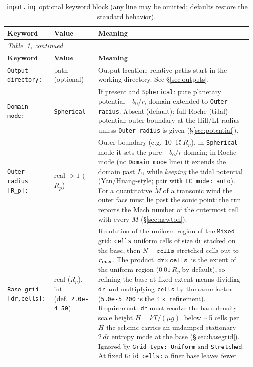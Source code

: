 \documentclass[english,a4paper]{my_memo}
\newcommand{\rp}{\ensuremath{R_p}}   %
\begin{document}
\begin{longtable}{@{}p{}p{}p{}@{}}
\caption{\texttt{input.inp} optional keyword block (any line may be omitted;
defaults restore the standard behavior).}\label{tab:inp-opt}\\
\toprule
\textbf{Keyword} & \textbf{Value} & \textbf{Meaning} \\
\midrule
\endfirsthead
\multicolumn{3}{l}{\small\itshape Table~\ref{tab:inp-opt}, continued}\\
\toprule \textbf{Keyword} & \textbf{Value} & \textbf{Meaning} \\ \midrule
\endhead
\bottomrule
\endfoot
\texttt{Output directory:} & path (optional) & Output location; relative paths
  start in the working directory. See \S\ref{sec:outputs}. \\
\texttt{Domain mode:} & \texttt{Spherical} & If present and \texttt{Spherical}:
  pure planetary potential $-b_0/r$, domain extended to \texttt{Outer radius}.
  Absent (default): full Roche (tidal) potential; outer boundary at the Hill/L1
  radius unless \texttt{Outer radius} is given (\S\ref{sec:potential}). \\
\texttt{Outer radius [R\_p]:} & real $>1$ (\rp) & Outer boundary (e.g.\
  10--15\,\rp). In \texttt{Spherical} mode it sets the pure-$-b_0/r$ domain; in
  Roche mode (no \texttt{Domain mode} line) it extends the domain past $L_1$ while
  \emph{keeping} the tidal potential (Yan/Huang-style; pair with
  \texttt{IC mode: auto}). For a quantitative $\dot M$ of a transonic wind the
  outer face must lie past the sonic point: the run reports the Mach number of
  the outermost cell with every $\dot M$ (\S\ref{sec:newton}). \\
\texttt{Base grid [dr,cells]:} & real (\rp), int
  (def.\ \texttt{2.0e-4 50}) & Resolution of the uniform region of the
  \texttt{Mixed} grid: \texttt{cells} uniform cells of size \texttt{dr} stacked
  on the base, then $N-\texttt{cells}$ stretched cells out to $r_{\rm max}$.
  The product $\texttt{dr}\times\texttt{cells}$ is the extent of the uniform
  region ($0.01\,R_p$ by default), so refining the base at fixed extent means
  dividing \texttt{dr} and multiplying \texttt{cells} by the same factor
  (\texttt{5.0e-5 200} is the $4\times$ refinement). Requirement: \texttt{dr}
  must resolve the base density scale height $H=kT/(\mu g)$; below $\sim$5 cells
  per $H$ the scheme carries an undamped stationary $2\,dr$ entropy mode at the
  base (\S\ref{sec:basegrid}). Ignored by \texttt{Grid type: Uniform} and
  \texttt{Stretched}. At fixed \texttt{Grid cells:} a finer base leaves fewer

\end{longtable}
\end{document}
